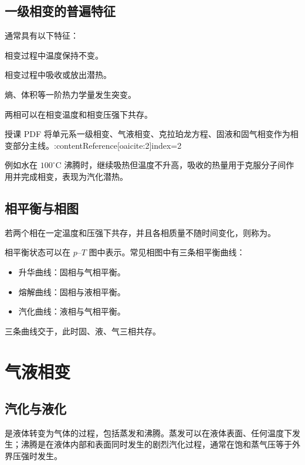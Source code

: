 \subsection{一级相变的普遍特征}

通常具有以下特征：
\begin{ReviewList}
  \item 相变过程中温度保持不变。
  \item 相变过程中吸收或放出潜热。
  \item 熵、体积等一阶热力学量发生突变。
  \item 两相可以在相变温度和相变压强下共存。
\end{ReviewList}

授课 PDF 将单元系一级相变、气液相变、克拉珀龙方程、固液和固气相变作为相变部分主线。:contentReference[oaicite:2]{index=2}

\begin{WarnBox}
例如水在 \(100^\circ\mathrm C\) 沸腾时，继续吸热但温度不升高，吸收的热量用于克服分子间作用并完成相变，表现为汽化潜热。
\end{WarnBox}

\subsection{相平衡与相图}

若两个相在一定温度和压强下共存，并且各相质量不随时间变化，则称为。

相平衡状态可以在 \(p\)--\(T\) 图中表示。常见相图中有三条相平衡曲线：
\begin{itemize}
  \item 升华曲线：固相与气相平衡。
  \item 熔解曲线：固相与液相平衡。
  \item 汽化曲线：液相与气相平衡。
\end{itemize}

三条曲线交于，此时固、液、气三相共存。

\section{气液相变}

\subsection{汽化与液化}

是液体转变为气体的过程，包括蒸发和沸腾。蒸发可以在液体表面、任何温度下发生；沸腾是在液体内部和表面同时发生的剧烈汽化过程，通常在饱和蒸气压等于外界压强时发生。

